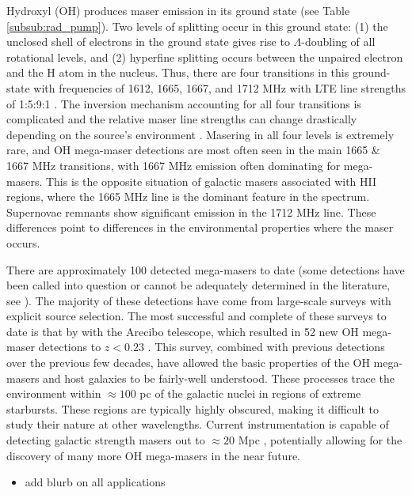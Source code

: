 
Hydroxyl (OH) produces maser emission in its ground state (see Table \ref{subsub:rad_pump}). Two levels of splitting occur in this ground state: (1) the unclosed shell of electrons in the ground state gives rise to $\Lambda$-doubling of all rotational levels, and (2) hyperfine splitting occurs between the unpaired electron and the H atom in the nucleus. Thus, there are four transitions in this ground-state with frequencies of 1612, 1665, 1667, and 1712 MHz with LTE line strengths of 1:5:9:1 \cite{lo2005}. The inversion mechanism accounting for all four transitions is complicated \citep{Elitzur_1992} and the relative maser line strengths can change drastically depending on the source's environment \citep{lo2005}. Masering in all four levels is extremely rare, and OH mega-maser detections are most often seen in the main 1665 \& 1667 MHz transitions, with 1667 MHz emission often dominating for mega-masers. This is the opposite situation of galactic masers associated with HII regions, where the 1665 MHz line is the dominant feature in the spectrum. Supernovae remnants show significant emission in the 1712 MHz line. These differences point to differences in the environmental properties where the maser occurs. 

There are approximately 100 detected mega-masers to date (some detections have been called into question or cannot be adequately determined in the literature, see \citet{darling2002_paperIII}). The majority of these detections have come from large-scale surveys with explicit source selection. The most successful and complete of these surveys to date is that by \citet{darling_2000_paperI} with the Arecibo telescope, which resulted in 52 new OH mega-maser detections to $z<0.23$ \citep{darling2002_paperIII}. This survey, combined with previous detections over the previous few decades, have allowed the basic properties of the OH mega-masers and host galaxies to be fairly-well understood. These processes trace the environment within $\approx 100$ pc of the galactic nuclei in regions of extreme starbursts. These regions are typically highly obscured, making it difficult to study their nature at other wavelengths. Current instrumentation is capable of detecting galactic strength masers out to $\approx 20$ Mpc \citep{darling2012}, potentially allowing for the discovery of many more OH mega-masers in the near future.

\begin{itemize}
\item add blurb on all applications
\end{itemize}

